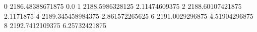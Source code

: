 0 2186.48388671875 0.0
1 2188.5986328125 2.11474609375
2 2188.60107421875 2.1171875
4 2189.345458984375 2.861572265625
6 2191.0029296875 4.51904296875
8 2192.7412109375 6.25732421875
